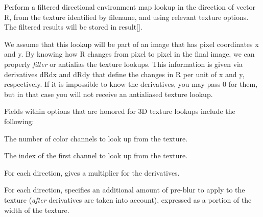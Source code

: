 
Perform a filtered directional environment map lookup in the direction
of vector {\cf R}, from the texture identified by {\cf filename}, and
using relevant texture {\cf options}.  The filtered results will be
stored in {\cf result[]}.

We assume that this lookup will be part of an image that has pixel
coordinates {\cf x} and {\cf y}.  By knowing how {\cf R} changes from
pixel to pixel in the final image, we can properly \emph{filter} or
antialias the texture lookups.  This information is given via
derivatives {\cf dRdx} and {\cf dRdy} that define the changes in {\cf R}
per unit of {\cf x} and {\cf y}, respectively.  If it is impossible to
know the derivatives, you may pass 0 for them, but in that case you will
not receive an antialiased texture lookup.

Fields within {\cf options} that are honored for 3D texture lookups
include the following:

\vspace{-12pt}
\vspace{10pt}
The number of color channels to look up from the texture.
\apiend

\vspace{-24pt}
\vspace{10pt}
The index of the first channel to look up from the texture.
\apiend

\vspace{-24pt}
\vspace{10pt}
For each direction, gives a multiplier for the derivatives.
\apiend

\vspace{-24pt}
\vspace{10pt}
For each direction, specifies an additional amount of pre-blur to apply
to the texture (\emph{after} derivatives are taken into account),
expressed as a portion of the width of the texture.
\apiend

